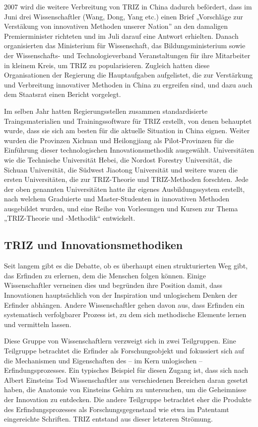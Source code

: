 \documentclass[11pt,a4paper]{article}
\begin{document}
2007 wird die weitere Verbreitung von TRIZ in China dadurch befördert, dass im
Juni drei Wissenschaftler (Wang, Dong, Yang etc.) einen Brief „Vorschläge zur
Verstäkung von innovativen Methoden unserer Nation” an den damaligen
Premierminister richteten und im Juli darauf eine Antwort erhielten. Danach
organisierten das Ministerium für Wissenschaft, das Bildungsministerium sowie
der Wissenschafts- und Technologieverband Veranstaltungen für ihre Mitarbeiter
in kleinem Kreis, um TRIZ zu popularisieren. Zugleich hatten diese
Organisationen der Regierung die Hauptaufgaben aufgelistet, die zur
Verstärkung und Verbreitung innovativer Methoden in China zu ergreifen sind,
und dazu auch dem Staatsrat einen Bericht vorgelegt.

Im selben Jahr hatten Regierungsstellen zusammen standardisierte
Traingsmaterialien und Trainingssoftware für TRIZ erstellt, von denen
behauptet wurde, dass sie sich am besten für die aktuelle Situation in China
eignen. Weiter wurden die Provinzen Xichuan und Heilongjiang als
Pilot-Provinzen für die Einführung dieser technologischen Innovationsmethodik
ausgewählt. Universitäten wie die Technische Universität Hebei, die Nordost
Forestry Universität, die Sichuan Universität, die Südwest Jiaotong
Universität und weitere waren die ersten Universitäten, die zur TRIZ-Theorie
und TRIZ-Methoden forschten. Jede der oben genannten Universitäten hatte ihr
eigenes Ausbildungssystem erstellt, nach welchem Graduierte und
Master-Studenten in innovativen Methoden ausgebildet wurden, und eine Reihe von
Vorlesungen und Kursen zur Thema „TRIZ-Theorie und -Methodik“ entwickelt.

\subsection{TRIZ und Innovationsmethodiken}

Seit langem gibt es die Debatte, ob es überhaupt einen strukturierten Weg
gibt, das Erfinden zu erlernen, dem die Menschen folgen können.  Einige
Wissenschaftler verneinen dies und begründen ihre Position damit, dass
Innovationen hauptsächlich von der Inspiration und unlogischem Denken der
Erfinder abhängen.  Andere Wissenschaftler gehen davon aus, dass Erfinden ein
systematisch verfolgbarer Prozess ist, zu dem sich methodische Elemente lernen
und vermitteln lassen.

Diese Gruppe von Wissenschaftlern verzweigt sich in zwei Teilgruppen. Eine
Teilgruppe betrachtet die Erfinder als Forschungsobjekt und fokussiert sich
auf die Mechanismen und Eigenschaften des -- im Kern unlogischen --
Erfindungsprozesses.  Ein typisches Beispiel für diesen Zugang ist, dass sich
nach Albert Einsteins Tod Wissenschaftler aus verschiedenen Bereichen daran
gesetzt haben, die Anatomie von Einsteins Gehirn zu untersuchen, um die
Geheimnisse der Innovation zu entdecken. Die andere Teilgruppe betrachtet eher
die Produkte des Erfindungsprozesses als Forschungsgegenstand wie etwa im
Patentamt eingereichte Schriften. TRIZ entstand aus dieser letzteren Strömung.
\end{document}
